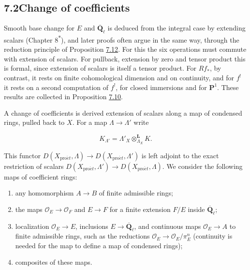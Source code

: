 \documentclass[11pt]{article}
\newcommand{\bpout}[1]{#1\textsuperscript{\hyperlink{bp-outside}{\ensuremath{\ast}}}}
\begin{document}
\subsection*{\texorpdfstring{7.2\quad Change of coefficients}{7.2 Change of coefficients}}
\label{bp8}%
\label{bp9}%
Smooth base change for \(E\) and \(\overline{\mathbf Q}_\ell\) is deduced from the integral case by extending scalars (Chapter \bpout{8}), and later proofs often argue in the same way, through the reduction principle of Proposition \hyperref[bp34]{7.12}. For this the six operations must commute with extension of scalars. For pullback, extension by zero and tensor product this is formal, since extension of scalars is itself a tensor product. For \(Rf_*\), by contrast, it rests on finite cohomological dimension and on continuity, and for \(f^!\) it rests on a second computation of \(f^!\), for closed immersions and for \(\mathbf P^1\). These results are collected in Proposition \hyperref[bp26]{7.10}.

A change of coefficients is derived extension of scalars along a map of condensed rings, pulled back to \(X\). For a map \(\Lambda\to\Lambda'\) write

\[
K_{\Lambda'}=\Lambda'_X\otimes^{\mathbf L}_{\Lambda_X}K.
\]

This functor \(D(X_{\mathrm{pro}\acute{e}t},\Lambda)\to D(X_{\mathrm{pro}\acute{e}t},\Lambda')\) is left adjoint to the exact restriction of scalars \(D(X_{\mathrm{pro}\acute{e}t},\Lambda')\to D(X_{\mathrm{pro}\acute{e}t},\Lambda)\). We consider the following maps of coefficient rings:

\begin{enumerate}
\item any homomorphism \(A\to B\) of finite admissible rings;
\item the maps \(\mathcal O_E\to\mathcal O_F\) and \(E\to F\) for a finite extension \(F/E\) inside \(\overline{\mathbf Q}_\ell\);
\item localization \(\mathcal O_E\to E\), inclusions \(E\to\overline{\mathbf Q}_\ell\), and continuous maps \(\mathcal O_E\to A\) to finite admissible rings, such as the reductions \(\mathcal O_E\to\mathcal O_E/\pi_E^n\) (continuity is needed for the map to define a map of condensed rings);
\item composites of these maps.
\end{enumerate}
\end{document}
